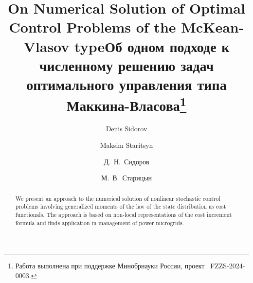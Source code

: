 \begin{englishtitle} %
\title{On Numerical Solution of Optimal Control Problems of the McKean-Vlasov type}
\author{Denis Sidorov \and Maksim Staritsyn
}

\maketitle

\begin{abstract}
We present an approach to the numerical solution of nonlinear stochastic control problems involving generalized moments of the law of the state distribution as cost functionals. The approach is based on non-local representations of the cost increment formula and finds application in management of power microgrids.

\end{abstract}
\end{englishtitle}

\iffalse
%
%


\documentclass[12pt]{llncs}  


\usepackage{iftex}

\ifPDFTeX
\usepackage[T2A]{fontenc}
\usepackage[utf8]{inputenc} %
\usepackage[english,russian]{babel}
\fi

\usepackage{todonotes} 

\usepackage[russian]{nla}


\fi

\title{Об одном подходе к численному решению задач оптимального управления типа Маккина-Власова\thanks{Работа выполнена при поддержке Минобрнауки России, проект \textnumero~FZZS-2024-0003.%
}}
\author{Д.~Н.~Сидоров \and М.~В.~Старицын
}

